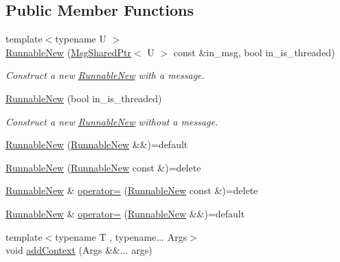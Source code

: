 \subsection*{Public Member Functions}
\begin{DoxyCompactItemize}
\item 
{\footnotesize template$<$typename U $>$ }\\\hyperlink{structvt_1_1runnable_1_1_runnable_new_a47b84af69a5444b9d837a3ffe4d4792b}{Runnable\+New} (\hyperlink{namespacevt_ab2b3d506ec8e8d1540aede826d84a239}{Msg\+Shared\+Ptr}$<$ U $>$ const \&in\+\_\+msg, bool in\+\_\+is\+\_\+threaded)
\begin{DoxyCompactList}\small\item\em Construct a new {\ttfamily \hyperlink{structvt_1_1runnable_1_1_runnable_new}{Runnable\+New}} with a message. \end{DoxyCompactList}\item 
\hyperlink{structvt_1_1runnable_1_1_runnable_new_a55ff785753c781903bf932a1e5faddd7}{Runnable\+New} (bool in\+\_\+is\+\_\+threaded)
\begin{DoxyCompactList}\small\item\em Construct a new {\ttfamily \hyperlink{structvt_1_1runnable_1_1_runnable_new}{Runnable\+New}} without a message. \end{DoxyCompactList}\item 
\hyperlink{structvt_1_1runnable_1_1_runnable_new_ac7e1d836710c2d0cd2791f1a1c5ac03c}{Runnable\+New} (\hyperlink{structvt_1_1runnable_1_1_runnable_new}{Runnable\+New} \&\&)=default
\item 
\hyperlink{structvt_1_1runnable_1_1_runnable_new_a4c34cf076ffd914c3d18aca7d2ff28db}{Runnable\+New} (\hyperlink{structvt_1_1runnable_1_1_runnable_new}{Runnable\+New} const \&)=delete
\item 
\hyperlink{structvt_1_1runnable_1_1_runnable_new}{Runnable\+New} \& \hyperlink{structvt_1_1runnable_1_1_runnable_new_a12c7ddbd735a9bf704b06ecea7c26e60}{operator=} (\hyperlink{structvt_1_1runnable_1_1_runnable_new}{Runnable\+New} const \&)=delete
\item 
\hyperlink{structvt_1_1runnable_1_1_runnable_new}{Runnable\+New} \& \hyperlink{structvt_1_1runnable_1_1_runnable_new_a3561cbcbc3197074cded8da204e98924}{operator=} (\hyperlink{structvt_1_1runnable_1_1_runnable_new}{Runnable\+New} \&\&)=default
\item 
{\footnotesize template$<$typename T , typename... Args$>$ }\\void \hyperlink{structvt_1_1runnable_1_1_runnable_new_a63fb77e8f9739e1eb3c7fb0dee6d8a1e}{add\+Context} (Args \&\&... args)

\end{DoxyCompactItemize}
